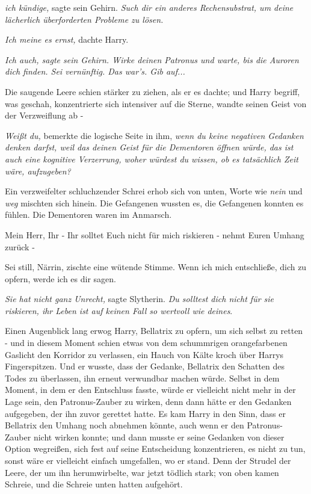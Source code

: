 \emph{ich kündige,} sagte sein Gehirn.\emph{ Such dir ein anderes
Rechensubstrat, um deine lächerlich überforderten Probleme zu lösen.}

\emph{Ich meine es ernst,} dachte Harry.

\emph{Ich auch, sagte sein Gehirn. Wirke deinen Patronus und warte, bis die
Auroren dich finden. Sei vernünftig. Das war's. Gib auf...}

Die saugende Leere schien stärker zu ziehen, als er es dachte; und Harry
begriff, was geschah, konzentrierte sich intensiver auf die Sterne, wandte
seinen Geist von der Verzweiflung ab -

\emph{Weißt du,} bemerkte die logische Seite in ihm, \emph{wenn du keine
negativen Gedanken denken darfst, weil das deinen Geist für die Dementoren
öffnen würde, das ist auch eine kognitive Verzerrung, woher würdest du wissen,
ob es tatsächlich Zeit wäre, aufzugeben?}

Ein verzweifelter schluchzender Schrei erhob sich von unten, Worte wie \glqq{}
\emph{nein}\grqq{} und \glqq{}\emph{weg}\grqq{} mischten sich hinein. Die
Gefangenen wussten es, die Gefangenen konnten es fühlen. Die Dementoren waren im
Anmarsch.

\glqq{}Mein Herr, Ihr - Ihr solltet Euch nicht für mich riskieren - nehmt Euren
Umhang zurück -\grqq{}

\glqq{}Sei still, Närrin\grqq{}, zischte eine wütende Stimme. \glqq{}Wenn ich mich
entschließe, dich zu opfern, werde ich es dir sagen.\grqq{}

\emph{Sie hat nicht ganz Unrecht,} sagte Slytherin. \emph{Du solltest dich nicht
für sie riskieren, ihr Leben ist auf keinen Fall so wertvoll wie deines}.

Einen Augenblick lang erwog Harry, Bellatrix zu opfern, um sich selbst zu retten
- und in diesem Moment schien etwas von dem schummrigen orangefarbenen Gaslicht
den Korridor zu verlassen, ein Hauch von Kälte kroch über Harrys Fingerspitzen.
Und er wusste, dass der Gedanke, Bellatrix den Schatten des Todes zu überlassen,
ihn erneut verwundbar machen würde. Selbst in dem Moment, in dem er den
Entschluss fasste, würde er vielleicht nicht mehr in der Lage sein, den
Patronus-Zauber zu wirken, denn dann hätte er den Gedanken aufgegeben, der ihn
zuvor gerettet hatte. Es kam Harry in den Sinn, dass er Bellatrix den Umhang
noch abnehmen könnte, auch wenn er den Patronus-Zauber nicht wirken konnte; und
dann musste er seine Gedanken von dieser Option wegreißen, sich fest auf seine
Entscheidung konzentrieren, es nicht zu tun, sonst wäre er vielleicht einfach
umgefallen, wo er stand. Denn der Strudel der Leere, der um ihn herumwirbelte,
war jetzt tödlich stark; von oben kamen Schreie, und die Schreie unten hatten
aufgehört.

